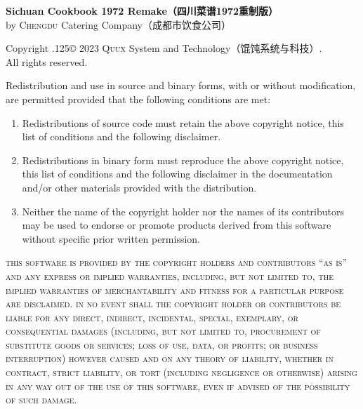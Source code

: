 \begingroup%

\newcommand\XeLaTeX{%
	\rmfamily%
	\footnotesize%
	X\kern-.1em\lower.5ex\hbox{\scalebox{-1}[1]{E}}\kern-.15em%
	L\kern-.36em\raise.428571ex\hbox{\scalefont{.7}{A}}\kern-.15em%
	T\kern-.166667em\lower.5ex\hbox{E}\kern-.125emX%
}

\footnotesize%
\singlespacing%
\setlength{\parindent}{0pt}%
\setlength{\parskip}{.1875\baselineskip}%
{\sffamily\bfseries Sichuan Cookbook 1972 Remake\!（四川菜谱1972重制版）}\\%
by \textsc{Chengdu} Catering Company\!（成都市饮食公司）

\null

Copyright {\lower.125\baselineskip\hbox{\copyright}} 2023
\textsc{Quux} System and Technology\!（馄饨系统与科技）\!\!\!.\\%
All rights reserved.

Redistribution and use in source and binary forms, with or without
modification, are permitted provided that the following conditions are met:

\begin{enumerate}
\item Redistributions of source code must retain the above copyright notice,
      this list of conditions and the following disclaimer.

\item Redistributions in binary form must reproduce the above copyright notice,
      this list of conditions and the following disclaimer in the documentation
      and\slash or other materials provided with the distribution.

\item Neither the name of the copyright holder nor the names of its
      contributors may be used to endorse or promote products derived from
      this software without specific prior written permission.
\end{enumerate}

\begingroup%
%
\textsc{this software is provided by the copyright holders and contributors
``as is'' and any express or implied warranties, including, but not limited to,
the implied warranties of merchantability and fitness for a particular purpose
are disclaimed. in no event shall the copyright holder or contributors be
liable for any direct, indirect, incidental, special, exemplary, or
consequential damages (including, but not limited to, procurement of
substitute goods or services; loss of use, data, or profits; or business
interruption) however caused and on any theory of liability, whether in
contract, strict liability, or tort (including negligence or otherwise)
arising in any way out of the use of this software, even if advised of the
possibility of such damage.}

